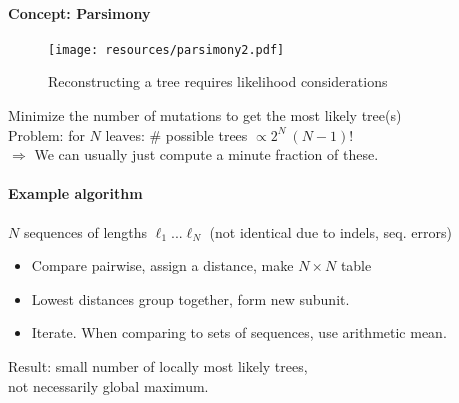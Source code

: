 \documentclass{beamer}
\begin{document}
\begin{darkframes}
\begin{frame}{\secname}
\begin{itemize}
      \end{itemize}
    \end{frame}



    \begin{frame}{\secname}

      \framesubtitle{Concept: Parsimony}

      \begin{figure}
        \texttt{[image: resources/parsimony2.pdf]}
        \caption{\footnotesize Reconstructing a tree requires likelihood considerations}
      \end{figure}
      \footnotesize

      Minimize the number of mutations to get the most likely tree(s)\\[1mm]

      Problem: for $N$ leaves: \hspace*{.5cm}\# possible trees $\propto 2^N\ (N-1) !$\\[1mm]

      $\Rightarrow$ We can usually just compute a minute fraction of these.

    \end{frame}


    \begin{frame}{\secname}
      \framesubtitle{Example algorithm}

      \vfill
      $N$ sequences of lengths $\ell_1 ... \ell_N$ \small \hspace*{.3cm}(not identical due to indels, seq. errors)
      \begin{itemize}
        \item Compare pairwise, assign a distance, make $N \times N$ table
        \item Lowest distances group together, form new subunit.
        \item Iterate. When comparing to sets of sequences, use arithmetic mean.
      \end{itemize}

      Result: small number of locally most likely trees,\\
      \hspace*{1.06cm}not necessarily global maximum.


\end{frame}
\end{darkframes}
\end{document}
